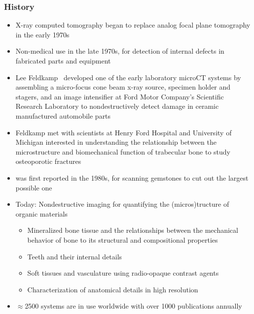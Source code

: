 \begin{frame}[allowframebreaks]
  \frametitle{\uct{} History}
  \begin{itemize}
    \item X-ray computed tomography began to replace analog focal plane tomography in the early 1970s~\cite{Lin2019}%
    \item Non-medical use in the late 1970s, for detection of internal defects in fabricated parts and equipment%
    \item Lee Feldkamp~\cite{Feldkamp1984} developed one of the early laboratory microCT systems by assembling a micro-focus cone beam x-ray source, specimen holder and stagers, and an image intensifier at Ford Motor Company’s Scientific Research Laboratory to nondestructively detect damage in ceramic manufactured automobile parts%
    \item Feldkamp met with scientists at Henry Ford Hospital and University of Michigan interested in understanding the relationship between the microstructure and biomechanical function of trabecular bone to study osteoporotic fractures~\cite{Feldkamp1983}%
    \item \uct{} was first reported in the 1980s, for scanning gemstones to cut out the largest possible one%
    \item Today: Nondestructive imaging for quantifying the (micros)tructure of organic materials%
      \begin{itemize}%
        \item Mineralized bone tissue and the relationships between the mechanical behavior of bone to its structural and compositional properties%
        \item Teeth and their internal details%
        \item Soft tissues and vasculature using radio-opaque contrast agents%
        \item Characterization of anatomical details in high resolution%
      \end{itemize}%
    \item \(\approx\)2500 \uct{} systems are in use worldwide with over 1000 publications annually%
  \end{itemize}
\end{frame}

